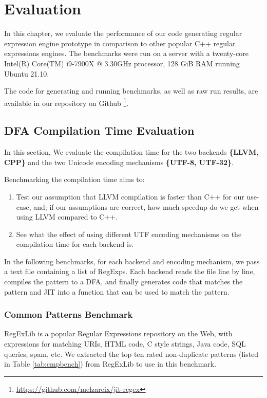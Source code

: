 \chapter{Evaluation}\label{chapter:evaluation}
In this chapter, we evaluate the performance of our code generating regular expression engine prototype in comparison to other popular C++ regular expressions engines. The benchmarks were run on a server with a twenty-core Intel(R) Core(TM) i9-7900X @ 3.30GHz processor, 128 GiB RAM running Ubuntu 21.10.

The code for generating and running benchmarks, as well as raw run results, are available in our repository on Github \footnote{\url{https://github.com/melzareix/jit-regex}}.

\newcommand\rownumberone{\stepcounter{magicrownumbers1}\arabic{magicrownumbers1}}
\newcommand\rownumbertwo{\stepcounter{magicrownumbers2}\arabic{magicrownumbers2}}
\newcommand\rownumberthree{\stepcounter{magicrownumbers3}\arabic{magicrownumbers3}}

\section{DFA Compilation Time Evaluation}
In this section, We evaluate the compilation time for the two backends \textbf{\{LLVM, CPP\}} and the two Unicode encoding mechanisms \textbf{\{UTF-8, UTF-32\}}.

Benchmarking the compilation time aims to:
\begin{enumerate}
    \item Test our assumption that LLVM compilation is faster than C++ for our use-case, and; if our assumptions are correct, how much speedup do we get when using LLVM compared to C++.
    
    \item See what the effect of using different UTF encoding mechanisms on the compilation time for each backend is.
\end{enumerate}

In the following benchmarks, for each backend and encoding mechanism, we pass a text file containing a list of RegExps. Each backend reads the file line by line, compiles the pattern to a DFA, and finally generates code that matches the pattern and JIT into a function that can be used to match the pattern.

\subsection{Common Patterns Benchmark}\label{cmnpatt}
RegExLib \cite{regexlib} is a popular Regular Expressions repository on the Web, with expressions for matching URIs, HTML code, C style strings, Java code, SQL queries, spam, etc. We extracted the top ten rated non-duplicate patterns (listed in Table \ref{tab:cmpbench}) from RegExLib to use in this benchmark.


